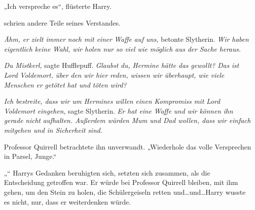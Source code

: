 „Ich verspreche es“, flüsterte Harry.

\emph{} schrien andere Teile seines Verstandes.

\emph{Ähm, er zielt immer noch mit einer Waffe auf uns,} betonte Slytherin. \emph{Wir haben eigentlich keine Wahl, wir holen nur so viel wie möglich aus der Sache heraus.}

\emph{Du Mistkerl,} sagte Hufflepuff. \emph{Glaubst du, Hermine hätte das gewollt? Das ist Lord Voldemort, über den wir hier reden, wissen wir überhaupt, wie viele Menschen er getötet hat und töten wird?}

\emph{Ich bestreite, dass wir um Hermines willen einen Kompromiss mit Lord Voldemort eingehen,} sagte Slytherin. \emph{Er hat eine Waffe und wir können ihn gerade nicht} \emph{aufhalten. Außerdem würden Mum und Dad wollen, dass wir einfach mitgehen und in Sicherheit sind.}

Professor Quirrell betrachtete ihn unverwandt.
„Wiederhole das volle Versprechen in Parsel, Junge.“

„“
Harrys Gedanken beruhigten sich, setzten sich zusammen, als die Entscheidung getroffen war. Er würde bei Professor Quirrell bleiben, mit ihm gehen, um den Stein zu holen, die Schülergeiseln retten und…und…Harry wusste es nicht, nur, dass er weiterdenken würde.

